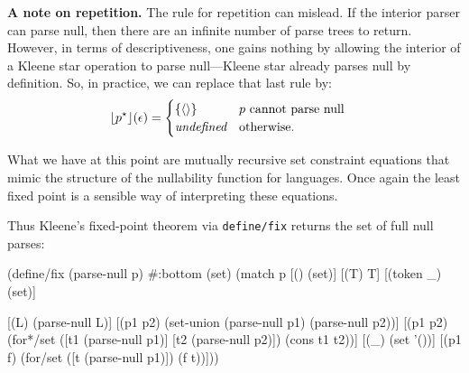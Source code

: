 


\textbf{A note on repetition.} 
%
The rule for repetition can mislead.
%
If the interior parser can parse null, then there are an infinite number of parse trees to return.
%
However, in terms of descriptiveness, one gains nothing by allowing the interior of a Kleene star operation
to parse null---Kleene star already parses null by definition.
%
So, in practice, we can replace that last rule by:
\begin{align*}
 \lfloor p^\star \rfloor(\epsilon) &= 
 \begin{cases}
  \left\{\langle \rangle\right\}  &   p \text{ cannot parse null}
  \\
  \emph{undefined} & \text{otherwise.}
 \end{cases}
\end{align*}

What we have at this point are mutually recursive set constraint equations that mimic 
the structure of the nullability function for languages.
%
Once again the least fixed point is a sensible way of interpreting these equations.

Thus Kleene's fixed-point theorem via \texttt{define/fix} returns the set of
full null parses:
\begin{code}
(define/fix (parse-null p)
  #:bottom (set)
  (match p
    [(\ttempty)        (set)]
    [(\ttepsred T)     T]
    [(token _)  (set)]

    [(\ttdelta L)      (parse-null L)]
    [(\ttcup p1 p2)  (set-union (parse-null p1) (parse-null p2))]
    [(\ttcirc p1 p2)  (for*/set ([t1 (parse-null p1)]
                           [t2 (parse-null p2)])
                  (cons t1 t2))]
    [(\ttstar _)      (set '())]
    [(\ttred p1 f)  (for/set ([t (parse-null p1)])
                  (f t))])) \end{code}
%




